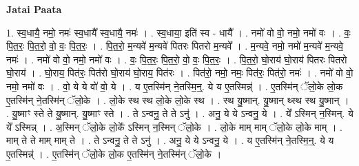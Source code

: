 \documentclass[17pt]{extarticle}
\begin{document}
\textbf{Jatai Paata} \newline

1. स्व॒धायै॒ नमो॒ नमः॑ स्व॒धायै᳚ स्व॒धायै॒ नमः॑ । . स्व॒धाया॒ इति॑ स्व - धायै᳚ । . नमो॑ वो वो॒ नमो॒ नमो॑ वः । . वः॒ पि॒त॒रः॒ पि॒त॒रो॒ वो॒ वः॒ पि॒त॒रः॒ । . पि॒त॒रो॒ म॒न्यवे॑ म॒न्यवे॑ पितरः पितरो म॒न्यवे᳚ । . म॒न्यवे॒ नमो॒ नमो॑ म॒न्यवे॑ म॒न्यवे॒ नमः॑ । . नमो॑ वो वो॒ नमो॒ नमो॑ वः । . वः॒ पि॒त॒रः॒ पि॒त॒रो॒ वो॒ वः॒ पि॒त॒रः॒ । . पि॒त॒रो॒ घो॒राय॑ घो॒राय॑ पितरः पितरो घो॒राय॑ । . घो॒राय॒ पित॑रः॒ पित॑रो घो॒राय॑ घो॒राय॒ पित॑रः । . पित॑रो॒ नमो॒ नमः॒ पित॑रः॒ पित॑रो॒ नमः॑ । . नमो॑ वो वो॒ नमो॒ नमो॑ वः । . वो॒ ये ये वो॑ वो॒ ये । . य ए॒तस्मि॑न् ने॒तस्मि॒न्॒. ये य ए॒तस्मिन्न्॑ । . ए॒तस्मि॑न् ॅलो॒के लो॒क ए॒तस्मि॑न् ने॒तस्मि॑न् ॅलो॒के । . लो॒के स्थ स्थ लो॒के लो॒के स्थ । . स्थ यु॒ष्मान्. यु॒ष्मान् थ्स्थ स्थ यु॒ष्मान् । . यु॒ष्माꣳ स्ते ते यु॒ष्मान्. यु॒ष्माꣳ स्ते । . ते ऽन्वनु॒ ते ते ऽनु॑ । . अनु॒ ये ये ऽन्वनु॒ ये । . ये᳚ ऽस्मिन् न॒स्मिन्. ये ये᳚ ऽस्मिन्न् । . अ॒स्मिन् ॅलो॒के लो॒के᳚ ऽस्मिन् न॒स्मिन् ॅलो॒के । . लो॒के माम् माम् ॅलो॒के लो॒के माम् । . माम् ते ते माम् माम् ते । . ते ऽन्वनु॒ ते ते ऽनु॑ । . अनु॒ ये ये ऽन्वनु॒ ये । . य ए॒तस्मि॑न् ने॒तस्मि॒न्॒. ये य ए॒तस्मिन्न्॑ । . ए॒तस्मि॑न् ॅलो॒के लो॒क ए॒तस्मि॑न् ने॒तस्मि॑न् ॅलो॒के । \newline
\end{document}
